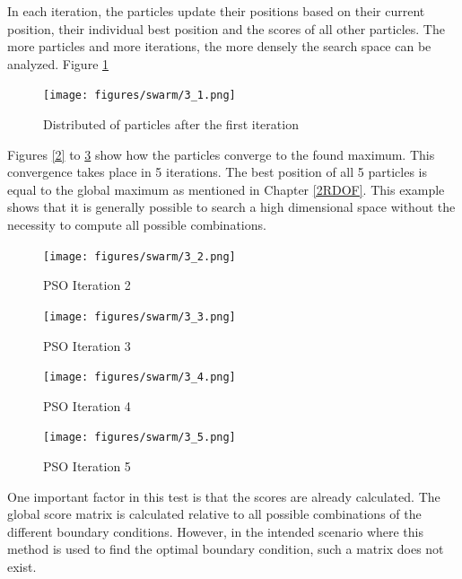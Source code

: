 In each iteration, the particles update their positions based on their current position, their individual best position and the scores of all other particles. The more particles and more iterations, the more densely the search space can be analyzed. 
Figure \ref{PSO_1}

\begin{figure}[H]
	\centerline{\texttt{[image: figures/swarm/3\_1.png]}}
	\caption{Distributed of particles after the first iteration}
	\label{PSO_1}
\end{figure}



Figures \ref{2} to \ref{5} show how the particles converge to the found maximum. This convergence takes place in 5 iterations. The best position of all 5 particles is equal to the global maximum as mentioned in Chapter \ref{2RDOF}. This example shows that it is generally possible to search a high dimensional space without the necessity to compute all possible combinations.


\begin{figure}[H]
	\centering
	\begin{minipage}{0.5\textwidth}
		\texttt{[image: figures/swarm/3\_2.png]}
		\caption{PSO Iteration 2}
		\label{2}
	\end{minipage}\hfill
	\begin{minipage}{0.5\textwidth}
		\texttt{[image: figures/swarm/3\_3.png]}
		\caption{PSO Iteration 3}
		\label{3}
	\end{minipage}\par
\end{figure}	
\begin{figure}[H]	
		\centering
	\begin{minipage}{0.5\textwidth}
		\texttt{[image: figures/swarm/3\_4.png]}
		\caption{PSO Iteration 4}
		\label{4}
	\end{minipage}\hfill
	\begin{minipage}{0.5\textwidth}
		\texttt{[image: figures/swarm/3\_5.png]}
		\caption{PSO Iteration 5}
		\label{5}
	\end{minipage}\par
\end{figure}

One important factor in this test is that the scores are already calculated. The global score matrix is calculated relative to all possible combinations of the different boundary conditions. However, in the intended scenario where this method is used to find the optimal boundary condition, such a matrix does not exist.

